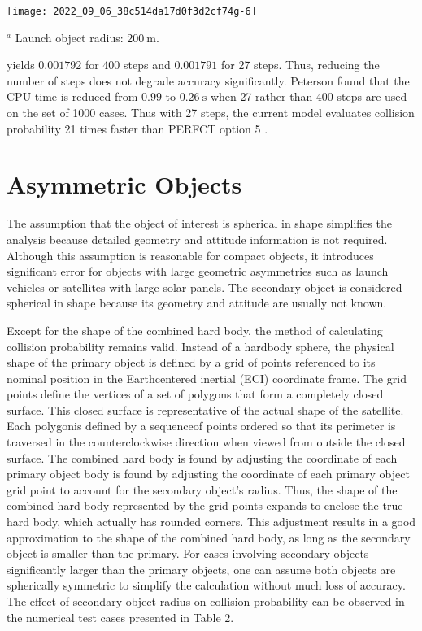 \documentclass[10pt]{article}
\begin{document}
\texttt{[image: 2022\_09\_06\_38c514da17d0f3d2cf74g-6]}

${ }^{a}$ Launch object radius: $200 \mathrm{~m} .$

yields $0.001792$ for 400 steps and $0.001791$ for 27 steps. Thus, reducing the number of steps does not degrade accuracy significantly. Peterson found that the CPU time is reduced from $0.99$ to $0.26 \mathrm{~s}$ when 27 rather than 400 steps are used on the set of 1000 cases. Thus with 27 steps, the current model evaluates collision probability 21 times faster than PERFCT option 5 .

\section{Asymmetric Objects}
The assumption that the object of interest is spherical in shape simplifies the analysis because detailed geometry and attitude information is not required. Although this assumption is reasonable for compact objects, it introduces significant error for objects with large geometric asymmetries such as launch vehicles or satellites with large solar panels. The secondary object is considered spherical in shape because its geometry and attitude are usually not known.

Except for the shape of the combined hard body, the method of calculating collision probability remains valid. Instead of a hardbody sphere, the physical shape of the primary object is defined by a grid of points referenced to its nominal position in the Earthcentered inertial (ECI) coordinate frame. The grid points define the vertices of a set of polygons that form a completely closed surface. This closed surface is representative of the actual shape of the satellite. Each polygonis defined by a sequenceof points ordered so that its perimeter is traversed in the counterclockwise direction when viewed from outside the closed surface. The combined hard body is found by adjusting the coordinate of each primary object body is found by adjusting the coordinate of each primary object grid point to account for the secondary object's radius. Thus, the shape of the combined hard body represented by the grid points expands to enclose the true hard body, which actually has rounded corners. This adjustment results in a good approximation to the shape of the combined hard body, as long as the secondary object is smaller than the primary. For cases involving secondary objects significantly larger than the primary objects, one can assume both objects are spherically symmetric to simplify the calculation without much loss of accuracy. The effect of secondary object radius on collision probability can be observed in the numerical test cases presented in Table $2 .$
\end{document}

